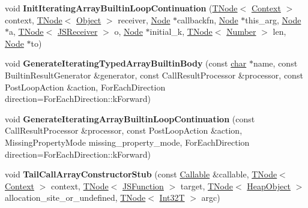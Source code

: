 \begin{DoxyCompactItemize}
\item 
\mbox{\label{classv8_1_1internal_1_1ArrayBuiltinsAssembler_ad8dfacb524117fd71fc3b811f1c531b9}} 
void {\bfseries Init\+Iterating\+Array\+Builtin\+Loop\+Continuation} (\mbox{\hyperlink{classv8_1_1internal_1_1compiler_1_1TNode}{T\+Node}}$<$ \mbox{\hyperlink{classv8_1_1internal_1_1Context}{Context}} $>$ context, \mbox{\hyperlink{classv8_1_1internal_1_1compiler_1_1TNode}{T\+Node}}$<$ \mbox{\hyperlink{classv8_1_1internal_1_1Object}{Object}} $>$ receiver, \mbox{\hyperlink{classv8_1_1internal_1_1compiler_1_1Node}{Node}} $\ast$callbackfn, \mbox{\hyperlink{classv8_1_1internal_1_1compiler_1_1Node}{Node}} $\ast$this\+\_\+arg, \mbox{\hyperlink{classv8_1_1internal_1_1compiler_1_1Node}{Node}} $\ast$a, \mbox{\hyperlink{classv8_1_1internal_1_1compiler_1_1TNode}{T\+Node}}$<$ \mbox{\hyperlink{classv8_1_1internal_1_1JSReceiver}{J\+S\+Receiver}} $>$ o, \mbox{\hyperlink{classv8_1_1internal_1_1compiler_1_1Node}{Node}} $\ast$initial\+\_\+k, \mbox{\hyperlink{classv8_1_1internal_1_1compiler_1_1TNode}{T\+Node}}$<$ \mbox{\hyperlink{structv8_1_1internal_1_1UnionT}{Number}} $>$ len, \mbox{\hyperlink{classv8_1_1internal_1_1compiler_1_1Node}{Node}} $\ast$to)
\item 
\mbox{\label{classv8_1_1internal_1_1ArrayBuiltinsAssembler_a56568c54c6dfab73bfc9b2e79d6db51a}} 
void {\bfseries Generate\+Iterating\+Typed\+Array\+Builtin\+Body} (const \mbox{\hyperlink{classchar}{char}} $\ast$name, const Builtin\+Result\+Generator \&generator, const Call\+Result\+Processor \&processor, const Post\+Loop\+Action \&action, For\+Each\+Direction direction=For\+Each\+Direction\+::k\+Forward)
\item 
\mbox{\label{classv8_1_1internal_1_1ArrayBuiltinsAssembler_adb6eb968a14e949f61bc6084ba362803}} 
void {\bfseries Generate\+Iterating\+Array\+Builtin\+Loop\+Continuation} (const Call\+Result\+Processor \&processor, const Post\+Loop\+Action \&action, Missing\+Property\+Mode missing\+\_\+property\+\_\+mode, For\+Each\+Direction direction=For\+Each\+Direction\+::k\+Forward)
\item 
\mbox{\label{classv8_1_1internal_1_1ArrayBuiltinsAssembler_ac36168eeb52813f9f45849a2859273e5}} 
void {\bfseries Tail\+Call\+Array\+Constructor\+Stub} (const \mbox{\hyperlink{classv8_1_1internal_1_1Callable}{Callable}} \&callable, \mbox{\hyperlink{classv8_1_1internal_1_1compiler_1_1TNode}{T\+Node}}$<$ \mbox{\hyperlink{classv8_1_1internal_1_1Context}{Context}} $>$ context, \mbox{\hyperlink{classv8_1_1internal_1_1compiler_1_1TNode}{T\+Node}}$<$ \mbox{\hyperlink{classv8_1_1internal_1_1JSFunction}{J\+S\+Function}} $>$ target, \mbox{\hyperlink{classv8_1_1internal_1_1compiler_1_1TNode}{T\+Node}}$<$ \mbox{\hyperlink{classv8_1_1internal_1_1HeapObject}{Heap\+Object}} $>$ allocation\+\_\+site\+\_\+or\+\_\+undefined, \mbox{\hyperlink{classv8_1_1internal_1_1compiler_1_1TNode}{T\+Node}}$<$ \mbox{\hyperlink{structv8_1_1internal_1_1Int32T}{Int32T}} $>$ argc)

\end{DoxyCompactItemize}
